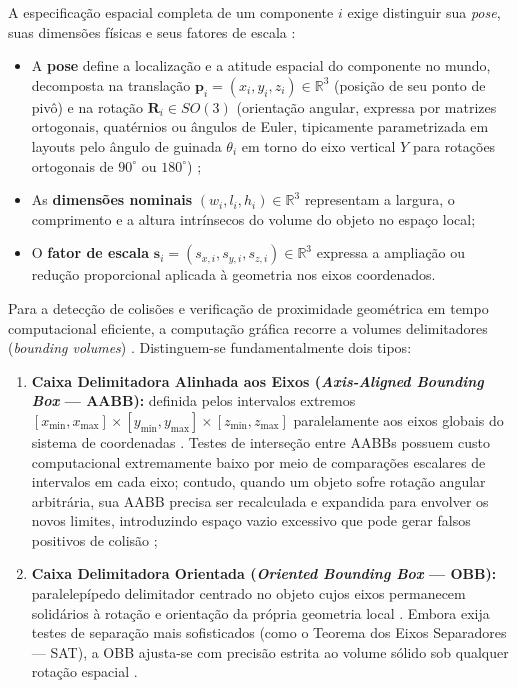 A especificação espacial completa de um componente $i$ exige distinguir sua \textit{pose}, suas dimensões físicas e seus fatores de escala \cite{ericson2004realtime, sun2024roomplanner, xu2025constraint}:
\begin{itemize}
    \item A \textbf{pose} define a localização e a atitude espacial do componente no mundo, decomposta na translação $\mathbf{p}_i = (x_i, y_i, z_i) \in \mathbb{R}^3$ (posição de seu ponto de pivô) e na rotação $\mathbf{R}_i \in SO(3)$ (orientação angular, expressa por matrizes ortogonais, quatérnios ou ângulos de Euler, tipicamente parametrizada em layouts pelo ângulo de guinada $\theta_i$ em torno do eixo vertical $Y$ para rotações ortogonais de $90^\circ$ ou $180^\circ$) \cite{sun2024roomplanner, xu2025databasedrivenframework3dlevel};
    \item As \textbf{dimensões nominais} $(w_i, l_i, h_i) \in \mathbb{R}^3$ representam a largura, o comprimento e a altura intrínsecos do volume do objeto no espaço local;
    \item O \textbf{fator de escala} $\mathbf{s}_i = (s_{x,i}, s_{y,i}, s_{z,i}) \in \mathbb{R}^3$ expressa a ampliação ou redução proporcional aplicada à geometria nos eixos coordenados.
\end{itemize}

Para a detecção de colisões e verificação de proximidade geométrica em tempo computacional eficiente, a computação gráfica recorre a volumes delimitadores (\textit{bounding volumes}) \cite{ericson2004realtime, sun2024roomplanner, xu2025constraint}. Distinguem-se fundamentalmente dois tipos:
\begin{enumerate}
    \item \textbf{Caixa Delimitadora Alinhada aos Eixos (\textit{Axis-Aligned Bounding Box} --- AABB):} definida pelos intervalos extremos $[x_{\min}, x_{\max}] \times [y_{\min}, y_{\max}] \times [z_{\min}, z_{\max}]$ paralelamente aos eixos globais do sistema de coordenadas \cite{ericson2004realtime}. Testes de interseção entre AABBs possuem custo computacional extremamente baixo por meio de comparações escalares de intervalos em cada eixo; contudo, quando um objeto sofre rotação angular arbitrária, sua AABB precisa ser recalculada e expandida para envolver os novos limites, introduzindo espaço vazio excessivo que pode gerar falsos positivos de colisão \cite{ericson2004realtime};
    \item \textbf{Caixa Delimitadora Orientada (\textit{Oriented Bounding Box} --- OBB):} paralelepípedo delimitador centrado no objeto cujos eixos permanecem solidários à rotação e orientação da própria geometria local \cite{ericson2004realtime}. Embora exija testes de separação mais sofisticados (como o Teorema dos Eixos Separadores --- SAT), a OBB ajusta-se com precisão estrita ao volume sólido sob qualquer rotação espacial \cite{ericson2004realtime}.
\end{enumerate}

